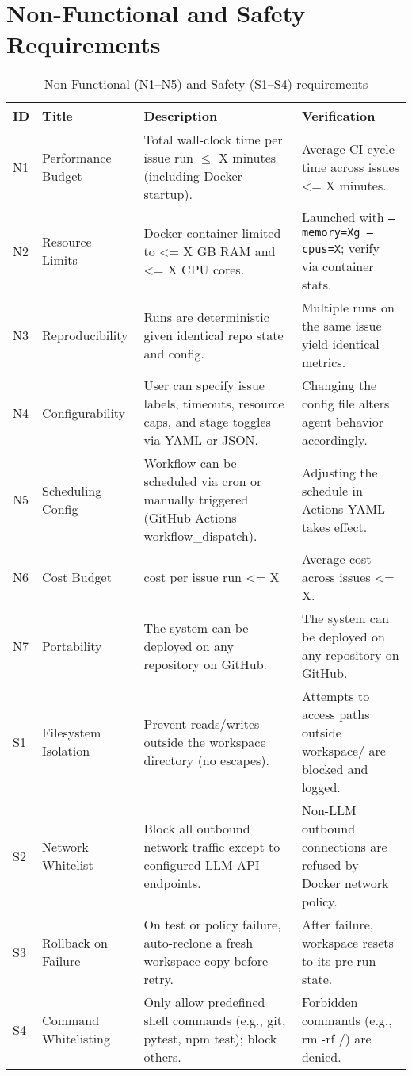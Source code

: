 \section{Non-Functional and Safety Requirements}

\begin{table}[ht]
    \centering
    \small
    \begin{tabular*}{\textwidth}{@{\extracolsep{\fill}} p{1cm} p{2cm} p{5cm} p{4cm} @{}}
        \toprule
        \textbf{ID} & \textbf{Title} & \textbf{Description} & \textbf{Verification} \\
        \midrule
        N1 & Performance Budget
        & Total wall-clock time per issue run $\leq$ X minutes (including Docker startup).
        & Average CI-cycle time across issues <= X minutes. \\[4pt]
        N2 & Resource Limits
        & Docker container limited to <= X GB RAM and <= X CPU cores.
        & Launched with \texttt{--memory=Xg --cpus=X}; verify via container stats. \\[4pt]
        N3 & Reproducibility
        & Runs are deterministic given identical repo state and config.
        & Multiple runs on the same issue yield identical metrics. \\[4pt]
        N4 & Configurability
        & User can specify issue labels, timeouts, resource caps, and stage toggles via YAML or JSON.
        & Changing the config file alters agent behavior accordingly. \\[4pt]
        N5 & Scheduling Config
        & Workflow can be scheduled via cron or manually triggered (GitHub Actions workflow\_dispatch).
        & Adjusting the schedule in Actions YAML takes effect. \\[4pt]
        N6 & Cost Budget
        & cost per issue run <= X
        & Average cost across issues <= X. \\[4pt]
        N7 & Portability
        & The system can be deployed on any repository on GitHub.
        & The system can be deployed on any repository on GitHub. \\[4pt]
        \midrule
        S1 & Filesystem Isolation
        & Prevent reads/writes outside the workspace directory (no escapes).
        & Attempts to access paths outside workspace/ are blocked and logged. \\[4pt]
        S2 & Network Whitelist
        & Block all outbound network traffic except to configured LLM API endpoints.
        & Non-LLM outbound connections are refused by Docker network policy. \\[4pt]
        S3 & Rollback on Failure
        & On test or policy failure, auto-reclone a fresh workspace copy before retry.
        & After failure, workspace resets to its pre-run state. \\[4pt]
        S4 & Command Whitelisting
        & Only allow predefined shell commands (e.g., git, pytest, npm test); block others.
        & Forbidden commands (e.g., rm -rf /) are denied. \\
        \bottomrule
    \end{tabular*}
    \caption{Non-Functional (N1--N5) and Safety (S1--S4) requirements}
\end{table}

